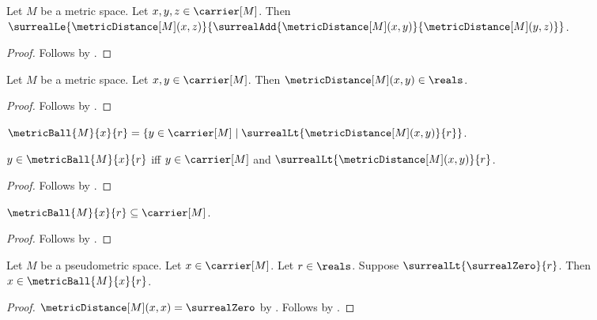 \begin{proposition}\label{metric_triangle}
    Let $M$ be a metric space.
    Let $x,y,z\in\carrier[M]$.
    Then $\surrealLe{\metricDistance[M](x,z)}
        {\surrealAdd{\metricDistance[M](x,y)}
            {\metricDistance[M](y,z)}}$.
\end{proposition}
\begin{proof}
    Follows by .
\end{proof}

\begin{proposition}\label{metric_distance_type}
    Let $M$ be a metric space.
    Let $x,y\in\carrier[M]$.
    Then $\metricDistance[M](x,y)\in\reals$.
\end{proposition}
\begin{proof}
    Follows by
        .
\end{proof}

\begin{definition}\label{metric_ball}
    $\metricBall{M}{x}{r}=
        \{y\in\carrier[M]\mid
            \surrealLt{\metricDistance[M](x,y)}{r}\}$.
\end{definition}

\begin{proposition}\label{metric_ball_iff}
    $y\in\metricBall{M}{x}{r}$ iff
        $y\in\carrier[M]$ and
        $\surrealLt{\metricDistance[M](x,y)}{r}$.
\end{proposition}
\begin{proof}
    Follows by .
\end{proof}

\begin{proposition}\label{metric_ball_subset_carrier}
    $\metricBall{M}{x}{r}\subseteq\carrier[M]$.
\end{proposition}
\begin{proof}
    Follows by .
\end{proof}

\begin{proposition}\label{metric_ball_contains_centre}
    Let $M$ be a pseudometric space.
    Let $x\in\carrier[M]$.
    Let $r\in\reals$.
    Suppose $\surrealLt{\surrealZero}{r}$.
    Then $x\in\metricBall{M}{x}{r}$.
\end{proposition}
\begin{proof}
    $\metricDistance[M](x,x)=\surrealZero$
        by .
    Follows by .
\end{proof}

